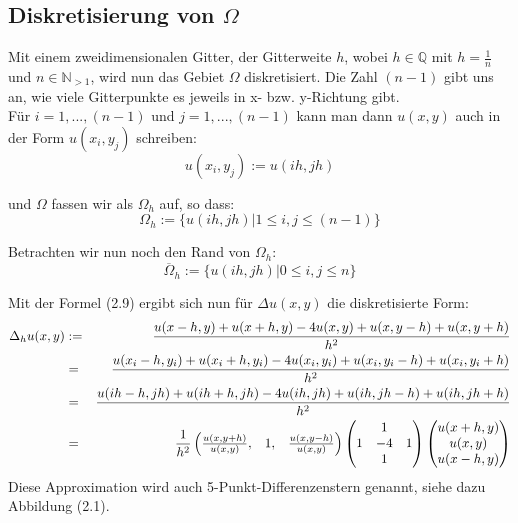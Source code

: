 \subsection{Diskretisierung von $\Omega$}\label{ss.Diskretisierung}

Mit einem zweidimensionalen Gitter, der Gitterweite $h$, wobei $h \in \mathbb{Q}$ mit $h = \frac {1} {n}$ und $n \in \mathbb{N}_{>1}$, wird nun das Gebiet $\Omega$ diskretisiert. Die Zahl $(n-1)$ gibt uns an, wie viele Gitterpunkte es jeweils in x- bzw. y-Richtung gibt.\\

Für $i = 1,...,(n-1)$ und $j = 1,...,(n-1)$ kann man dann $u(x,y)$ auch in der Form $u(x_{i},y_{j})$ schreiben:
\begin{equation}
u(x_{i},y_{j}) := u(ih,jh)
\end{equation}

und $\Omega$ fassen wir als $\Omega_{h}$ auf, so dass:
\begin{equation}
\Omega_{h} := \{u(ih, jh) | 1 \le i,j \le (n-1)\}
\end{equation}

Betrachten wir nun noch den Rand von $\Omega_{h}$:
\begin{equation}
\overline \Omega_{h} := \{u(ih, jh) | 0 \le i,j \le n\}
\end{equation}

Mit der Formel (2.9) ergibt sich nun für $\Delta u(x,y)$ die diskretisierte Form:
\begin{eqnarray}
\Delta_{h} u(x,y) &:=& \frac {u(x-h,y) + u(x+h,y) - 4u(x,y) + u(x,y-h) + u(x,y+h)} {h^{2}} \notag \\
&=& \frac {u(x_{i}-h,y_{i}) + u(x_{i}+h,y_{i}) - 4u(x_{i},y_{i}) + u(x_{i},y_{i}-h) + u(x_{i},y_{i}+h)} {h^{2}} \notag \\
&=& \frac {u(ih-h,jh)+u(ih+h,jh)-4u(ih,jh)+u(ih,jh-h)+u(ih,jh+h)} {h^{2}} \notag \\
&=& \frac {1} {h^{2}}
\begin{pmatrix}
\frac {u(x,y+h)} {u(x,y)}, & 1, & \frac {u(x,y-h)} {u(x,y)}
\end{pmatrix}
\begin{pmatrix}
  & 1 & \\
1 & -4 & 1 \\
  & 1 & 
\end{pmatrix}
\begin{pmatrix}
u(x+h,y) \\
u(x,y) \\
u(x-h,y)
\end{pmatrix}
\end{eqnarray}
Diese Approximation wird auch 5-Punkt-Differenzenstern genannt, siehe dazu Abbildung (2.1).

